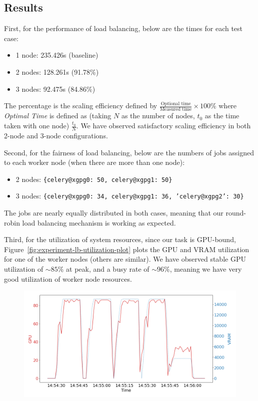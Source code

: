 \subsection{Results}
\label{ss:load-balancing-exp-results}

First, for the performance of load balancing, below are the times for each test case:

\begin{itemize}
    \item 1 node: 235.426s (baseline)
    \item 2 nodes: 128.261s (91.78\%)
    \item 3 nodes: 92.475s (84.86\%)
\end{itemize}
The percentage is the scaling efficiency defined by $\frac{\text{Optional time}}{\text{Measured time}}\times 100\%$ where \emph{Optimal Time} is defined as (taking $N$ as the number of nodes, $t_0$ as the time taken with one node) $\frac{t_0}{N}$. We have observed satisfactory scaling efficiency in both 2-node and 3-node configurations.

Second, for the fairness of load balancing, below are the numbers of jobs assigned to each worker node (when there are more than one node):

\begin{itemize}
    \item 2 nodes: \texttt{\{celery@xgpg0: 50, celery@xgpg1: 50\}}
    \item 3 nodes: \texttt{\{celery@xgpg0: 34, celery@xgpg1: 36, 'celery@xgpg2': 30\}}
\end{itemize}
The jobs are nearly equally distributed in both cases, meaning that our round-robin load balancing mechanism is working as expected.

Third, for the utilization of system resources, since our task is GPU-bound, Figure~\ref{fig:experiment-lb-utilization-plot} plots the GPU and VRAM utilization for one of the worker nodes (others are similar). We have observed stable GPU utilization of $\sim 85\%$ at peak, and a busy rate of $\sim 96\%$, meaning we have very good utilization of worker node resources.

\begin{figure}[H]
    \centering
    \includegraphics[width=\textwidth]{images/worker-utilization.png}
\end{figure}

